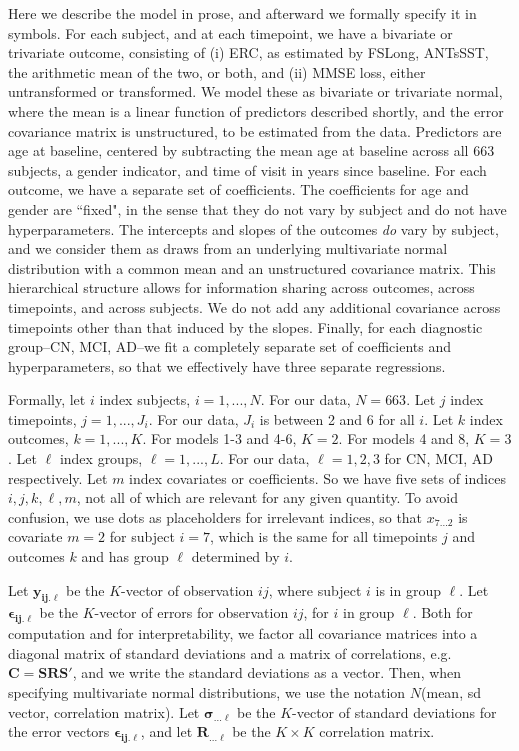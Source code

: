 \documentclass[12pt]{article}
\begin{document}
Here we describe the model in prose, and afterward we formally specify it in symbols. For each subject, and at each timepoint, we have a bivariate or trivariate outcome, consisting of (i) ERC, as estimated by FSLong, ANTsSST, the arithmetic mean of the two, or both, and (ii) MMSE loss, either untransformed or transformed. We model these as bivariate or trivariate normal, where the mean is a linear function of predictors described shortly, and the error covariance matrix is unstructured, to be estimated from the data. Predictors are age at baseline, centered by subtracting the mean age at baseline across all 663 subjects, a gender indicator, and time of visit in years since baseline. For each outcome, we have a separate set of coefficients. The coefficients for age and gender are ``fixed", in the sense that they do not vary by subject and do not have hyperparameters. The intercepts and slopes of the outcomes \textit{do} vary by subject, and we consider them as draws from an underlying multivariate normal distribution with a common mean and an unstructured covariance matrix. This hierarchical structure allows for information sharing across outcomes, across timepoints, and across subjects. We do not add any additional covariance across timepoints other than that induced by the slopes. Finally, for each diagnostic group--CN, MCI, AD--we fit a completely separate set of coefficients and hyperparameters, so that we effectively have three separate regressions. 

Formally, let $i$ index subjects, $i=1,...,N$. For our data, $N=663$. Let $j$ index timepoints, $j=1,...,J_i$. For our data, $J_i$ is between 2 and 6 for all $i$. Let $k$ index outcomes, $k=1,...,K$. For models 1-3 and 4-6, $K=2.$ For models 4 and 8, $K=3$. Let $\ell$ index groups, $\ell=1,...,L$. For our data, $\ell=1,2,3$ for CN, MCI, AD respectively. Let $m$ index covariates or coefficients. So we have five sets of indices $i,j,k,\ell,m$, not all of which are relevant for any given quantity. To avoid confusion, we use dots as placeholders for irrelevant indices, so that $x_{7...2}$ is covariate $m=2$ for subject $i=7$, which is the same for all timepoints $j$ and outcomes $k$ and has group $\ell$ determined by $i$. 

Let $\boldsymbol{y_{ij.\ell}}$ be the $K$-vector of observation $ij$, where subject $i$ is in group $\ell$. Let $\boldsymbol{\epsilon_{ij.\ell}}$ be the $K$-vector of errors for observation $ij$, for $i$ in group $\ell$. Both for computation and for interpretability, we factor all covariance matrices into a diagonal matrix of standard deviations and a matrix of correlations, e.g. $\boldsymbol{C=SRS'}$, and we write the standard deviations as a vector. Then, when specifying multivariate normal distributions, we use the notation $N$(mean, sd vector, correlation matrix). Let $\boldsymbol{\sigma_{...\ell}}$ be the $K$-vector of standard deviations for the error vectors $\boldsymbol{\epsilon_{ij.\ell}}$, and let $\boldsymbol{R_{...\ell}}$ be the $K \times K$ correlation matrix.
\end{document}
